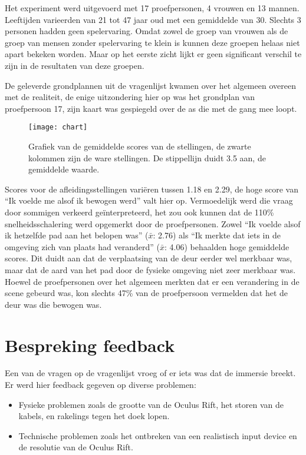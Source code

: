 Het experiment werd uitgevoerd met 17 proefpersonen, 4 vrouwen en 13 mannen.
Leeftijden varieerden van 21 tot 47 jaar oud met een gemiddelde van 30. Slechts
3 personen hadden geen spelervaring. Omdat zowel de groep van vrouwen als de
groep van mensen zonder spelervaring te klein is kunnen deze groepen helaas
niet apart bekeken worden. Maar op het eerste zicht lijkt er geen significant
verschil te zijn in de resultaten van deze groepen.

De geleverde grondplannen uit de vragenlijst kwamen over het algemeen overeen 
met de realiteit, de enige uitzondering hier op was het grondplan van 
proefpersoon 17, zijn kaart was gespiegeld over de as die met de gang mee loopt.

\begin{figure}[h!]
    \centering
    \texttt{[image: chart]}
    \caption{Grafiek van de gemiddelde scores van de stellingen, de zwarte 
    kolommen zijn de ware stellingen. De stippellijn duidt 3.5 aan, de gemiddelde
    waarde.}
    \label{fig:chart}
\end{figure}

Scores voor de afleidingsstellingen vari\"eren tussen 1.18 en 2.29, de hoge score
van ``Ik voelde me alsof ik bewogen werd'' valt hier op. Vermoedelijk werd die
vraag door sommigen verkeerd ge\"interpreteerd, het zou ook kunnen dat de 110\%
snelheidsschalering werd opgemerkt door de proefpersonen. Zowel ``Ik voelde alsof 
ik hetzelfde pad aan het belopen was'' ($\bar{x}$: 2.76) als ``Ik merkte dat iets 
in de omgeving zich van plaats had veranderd'' ($\bar{x}$: 4.06) behaalden hoge
gemiddelde scores. Dit duidt aan dat de verplaatsing van de deur eerder wel
merkbaar was, maar dat de aard van het pad door de fysieke omgeving niet zeer
merkbaar was. Hoewel de proefpersonen over het algemeen merkten dat er een 
verandering in de scene gebeurd was, kon slechts 47\% van de proefpersoon
vermelden dat het de deur was die bewogen was.


\section{Bespreking feedback}
Een van de vragen op de vragenlijst vroeg of er iets was dat de immersie breekt.
Er werd hier feedback gegeven op diverse problemen:

\begin{itemize}
  \item Fysieke problemen zoals de grootte van de Oculus Rift, het storen van de
        kabels, en rakelings tegen het doek lopen.
  \item Technische problemen zoals het ontbreken van een realistisch input device
        en de resolutie van de Oculus Rift.
\end{itemize}


